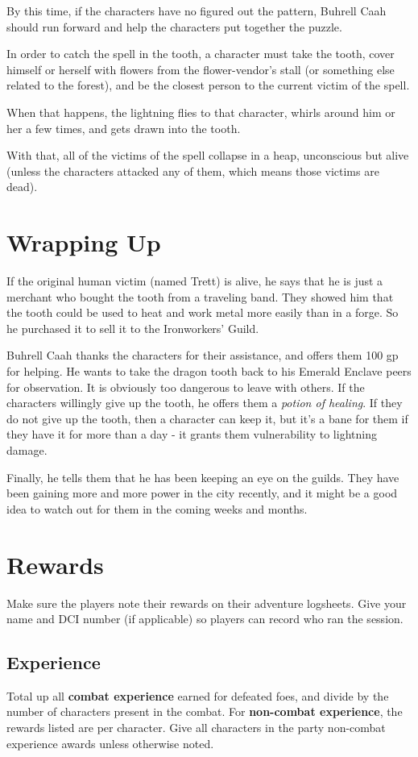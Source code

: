 \documentclass[10pt,a4paper,twoside,bg=print,twocolumn,openany,nodeprecatedcode]{dndbook}
\begin{document}
By this time, if the characters have no figured out the pattern, Buhrell Caah should run forward and help the characters put together the puzzle.

In order to catch the spell in the tooth, a character must take the tooth, cover himself or herself with flowers from the flower-vendor's stall (or something else related to the forest), and be the closest person to the current victim of the spell.

When that happens, the lightning flies to that character, whirls around him or her a few times, and gets drawn into the tooth.

With that, all of the victims of the spell collapse in a heap, unconscious but alive (unless the characters attacked any of them, which means those victims are dead).

\section{Wrapping Up}
If the original human victim (named Trett) is alive, he says that he is just a merchant who bought the tooth from a traveling band. They showed him that the tooth could be used to heat and work metal more easily than in a forge. So he purchased it to sell it to the Ironworkers' Guild.

Buhrell Caah thanks the characters for their assistance, and offers them 100 gp for helping. He wants to take the dragon tooth back to his Emerald Enclave peers for observation. It is obviously too dangerous to leave with others. If the characters willingly give up the tooth, he offers them a \textit{potion of healing}. If they do not give up the tooth, then a character can keep it, but it's a bane for them if they have it for more than a day - it grants them vulnerability to lightning damage.

Finally, he tells them that he has been keeping an eye on the guilds. They have been gaining more and more power in the city recently, and it might be a good idea to watch out for them in the coming weeks and months.

\section{Rewards}
Make sure the players note their rewards on their adventure logsheets. Give your name and DCI number (if applicable) so players can record who ran the session.

\subsection{Experience}
Total up all \textbf{combat experience} earned for defeated foes, and divide by the number of characters present in the combat. For \textbf{non-combat experience}, the rewards listed are per character. Give all characters in the party non-combat experience awards unless otherwise noted.
\end{document}
